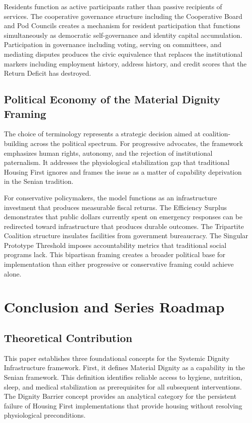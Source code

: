 \documentclass[12pt, letterpaper]{article}
\begin{document}
Residents function as active participants rather than passive recipients of services. The cooperative governance structure including the Cooperative Board and Pod Councils creates a mechanism for resident participation that functions simultaneously as democratic self-governance and identity capital accumulation. Participation in governance including voting, serving on committees, and mediating disputes produces the civic equivalence that replaces the institutional markers including employment history, address history, and credit scores that the Return Deficit has destroyed.

\subsection{Political Economy of the Material Dignity Framing}

The choice of terminology represents a strategic decision aimed at coalition-building across the political spectrum. For progressive advocates, the framework emphasizes human rights, autonomy, and the rejection of institutional paternalism. It addresses the physiological stabilization gap that traditional Housing First ignores and frames the issue as a matter of capability deprivation in the Senian tradition.

For conservative policymakers, the model functions as an infrastructure investment that produces measurable fiscal returns. The Efficiency Surplus demonstrates that public dollars currently spent on emergency responses can be redirected toward infrastructure that produces durable outcomes. The Tripartite Coalition structure insulates facilities from government bureaucracy. The Singular Prototype Threshold imposes accountability metrics that traditional social programs lack. This bipartisan framing creates a broader political base for implementation than either progressive or conservative framing could achieve alone.

\newpage
\section{Conclusion and Series Roadmap}

\subsection{Theoretical Contribution}

This paper establishes three foundational concepts for the Systemic Dignity Infrastructure framework. First, it defines Material Dignity as a capability in the Senian framework. This definition identifies reliable access to hygiene, nutrition, sleep, and medical stabilization as prerequisites for all subsequent interventions. The Dignity Barrier concept provides an analytical category for the persistent failure of Housing First implementations that provide housing without resolving physiological preconditions.
\end{document}
